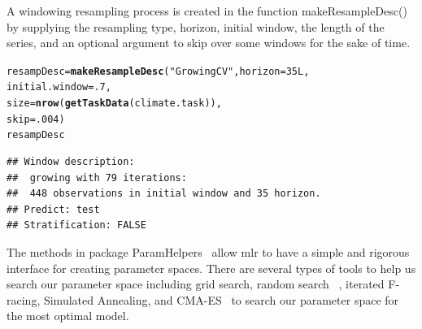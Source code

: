 \documentclass[12pt]{article}\usepackage[]{graphicx}\usepackage[]{color}
\makeatletter
\newcommand{\hlnum}[1]{\textcolor[rgb]{0.686,0.059,0.569}{#1}}%
\newcommand{\hlstr}[1]{\textcolor[rgb]{0.192,0.494,0.8}{#1}}%
\newcommand{\hlstd}[1]{\textcolor[rgb]{0.345,0.345,0.345}{#1}}%
\newcommand{\hlkwb}[1]{\textcolor[rgb]{0.69,0.353,0.396}{#1}}%
\newcommand{\hlkwc}[1]{\textcolor[rgb]{0.333,0.667,0.333}{#1}}%
\newcommand{\hlkwd}[1]{\textcolor[rgb]{0.737,0.353,0.396}{\textbf{#1}}}%
\newenvironment{kframe}{%
 \def\at@end@of@kframe{}%
 \ifinner\ifhmode%
  \def\at@end@of@kframe{\end{minipage}}%
  \begin{minipage}{\columnwidth}%
 \fi\fi%
 \def\FrameCommand##1{\hskip\@totalleftmargin \hskip-\fboxsep
 \colorbox{shadecolor}{##1}\hskip-\fboxsep
     \hskip-\linewidth \hskip-\@totalleftmargin \hskip\columnwidth}%
 \MakeFramed {\advance\hsize-\width
   \@totalleftmargin\z@ \linewidth\hsize
   \@setminipage}}%
 {\par\unskip\endMakeFramed%
 \at@end@of@kframe}
\newenvironment{knitrout}{}{} %
\theoremstyle{definition}
\newcommand\code{\@codex}
\def\@codex#1{{\normalfont\ttfamily\hyphenchar\font=-1 #1}}
\newcommand{\pkg}[1]{{\fontseries{b}\selectfont #1}}
\makeatother
\begin{document}
A windowing resampling process is created in the function \code{makeResampleDesc()} by supplying the resampling type, horizon, initial window, the length of the series, and an optional argument to skip over some windows for the sake of time.

\singlespacing
\begin{knitrout}
\color{fgcolor}\begin{kframe}
\begin{alltt}
\hlstd{resampDesc} \hlkwb{=} \hlkwd{makeResampleDesc}\hlstd{(}\hlstr{"GrowingCV"}\hlstd{,} \hlkwc{horizon} \hlstd{=} \hlnum{35L}\hlstd{,}
                               \hlkwc{initial.window} \hlstd{=} \hlnum{.7}\hlstd{,}
                               \hlkwc{size} \hlstd{=} \hlkwd{nrow}\hlstd{(}\hlkwd{getTaskData}\hlstd{(climate.task)),}
                               \hlkwc{skip} \hlstd{=} \hlnum{.004}\hlstd{)}
\hlstd{resampDesc}
\end{alltt}
\begin{verbatim}
## Window description:
##  growing with 79 iterations:
##  448 observations in initial window and 35 horizon.
## Predict: test
## Stratification: FALSE
\end{verbatim}
\end{kframe}
\end{knitrout}
\doublespacing

The methods in package \pkg{ParamHelpers}~\cite{paramhelper} allow \pkg{mlr} to have a simple and rigorous interface for creating parameter spaces. There are several types of tools to help us search our parameter space including grid search, random search ~\cite{Bergstra}, iterated F-racing, Simulated Annealing, and CMA-ES~\cite{cmaes}  to search our parameter space for the most optimal model.
\end{document}

